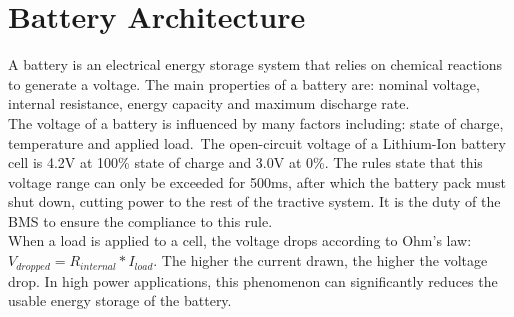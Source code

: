 \section{Battery Architecture}
A battery is an electrical energy storage system that relies on chemical reactions to generate a voltage. The main properties of a battery are: nominal voltage, internal resistance, energy capacity and maximum discharge rate.\\
The voltage of a battery is influenced by many factors including: state of charge, temperature and applied load.\ The open-circuit voltage of a Lithium-Ion battery cell is 4.2V at 100\% state of charge and 3.0V at 0\%. The rules \cite[EV 5.8.6]{fsg2020} state that this voltage range can only be exceeded for 500ms, after which the battery pack must shut down, cutting power to the rest of the tractive system. It is the duty of the BMS to ensure the compliance to this rule.\\
When a load is applied to a cell, the voltage drops according to Ohm's law: $V_{dropped} = R_{internal}*I_{load}$. The higher the current drawn, the higher the voltage drop. In high power applications, this phenomenon can significantly reduces the usable energy storage of the battery.

